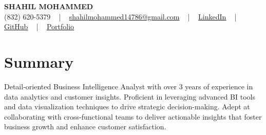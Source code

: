 \documentclass[letterpaper,10pt]{article}
\begin{document}
\begin{center}
    {\fontsize{14pt}{12pt}\selectfont \textbf{\MakeUppercase{Shahil Mohammed}}}\\ \vspace{2pt}
    \fontsize{10pt}{12pt}\selectfont (832) 620-5379 ~ | ~ \href{mailto:shahilmohammed14786@gmail.com}{shahilmohammed14786@gmail.com} ~ | ~  
    \href{https://www.linkedin.com/in/shahil-mohammed-9652931a1/}{\color{blue}\underline{LinkedIn}}  ~ | ~ 
    \href{https://github.com/freakbeast14}{\color{blue}\underline{GitHub}} ~ | ~ 
    \href{https://shahil-mohammed.netlify.app/}{\color{blue}\underline{Portfolio}}
    \vspace{-8pt}
\end{center}

\section{Summary}
\vspace{-2pt}\fontsize{8pt}{9pt}\selectfont
Detail-oriented Business Intelligence Analyst with over 3 years of experience in data analytics and customer insights. Proficient in leveraging advanced BI tools and data visualization techniques to drive strategic decision-making. Adept at collaborating with cross-functional teams to deliver actionable insights that foster business growth and enhance customer satisfaction. 
 \vspace{-5pt}
 
\vspace{-2pt}
\end{document}
